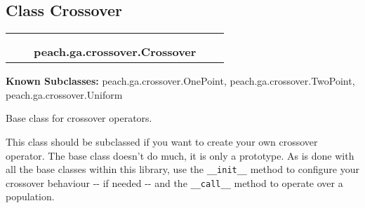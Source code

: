 
\subsection{Class Crossover}

    \label{peach:ga:crossover:Crossover}
\begin{tabular}{cccccc}
\multicolumn{2}{r}{\settowidth{\BCL}{object}\multirow{2}{\BCL}{object}}
&&
  \\\cline{3-3}
  &&\multicolumn{1}{c|}{}
&&
  \\
&&\multicolumn{2}{l}{\textbf{peach.ga.crossover.Crossover}}
\end{tabular}

\textbf{Known Subclasses:}
peach.ga.crossover.OnePoint,
    peach.ga.crossover.TwoPoint,
    peach.ga.crossover.Uniform


Base class for crossover operators.

This class should be subclassed if you want to create your own crossover
operator. The base class doesn't do much, it is only a prototype. As is done
with all the base classes within this library, use the \texttt{\_\_init\_\_} method
to configure your crossover behaviour -{}- if needed -{}- and the \texttt{\_\_call\_\_}
method to operate over a population.

